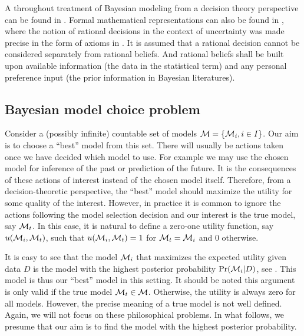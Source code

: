 \documentclass[11pt, hyper, bib, fontset=Minion]{marticle}
\begin{document}
A throughout treatment of Bayesian modeling from a decision theory perspective
can be found in \textcite{Robert:2007tc}. Formal mathematical representations
can also be found in \textcite[][sec.~5.1 and sec.~6.1]{Bernardo:1994vd},
where the notion of rational decisions in the context of uncertainty was made
precise in the form of axioms in \textcite[][chap.~2]{Bernardo:1994vd}. It is
assumed that a rational decision cannot be considered separately from rational
beliefs. And rational beliefs shall be built upon available information (the
data in the statistical term) and any personal preference input (the prior
information in Bayesian literatures).

\subsection{Bayesian model choice problem}
\label{sub:Bayesian model choice problem}

Consider a (possibly infinite) countable set of models $\mathcal{M} = \{\mathcal{M}_i,
i\in I\}$. Our aim is to choose a ``best'' model from this set. There will
usually be actions taken once we have decided which model to use. For example
we may use the chosen model for inference of the past or prediction of the
future. It is the consequences of these actions of interest instead of the
chosen model itself. Therefore, from a decision-theoretic perspective, the
``best'' model should maximize the utility for some quality of the interest.
However, in practice it is common to ignore the actions following the model
selection decision and our interest is the true model, say $\mathcal{M}_t$. In this
case, it is natural to define a zero-one utility function, say
$u(\mathcal{M}_i,\mathcal{M}_t)$, such that $u(\mathcal{M}_i,\mathcal{M}_t) = 1$ for $\mathcal{M}_t =
\mathcal{M}_i$ and $0$ otherwise.

It is easy to see that the model $\mathcal{M}_i$ that maximizes the expected utility
given data $D$ is the model with the highest posterior probability
$\Pr(\mathcal{M}_i|D)$, see \textcite[][chap.~6]{Bernardo:1994vd}. This model is
thus our ``best'' model in this setting. It should be noted this argument is
only valid if the true model $\mathcal{M}_t \in \mathcal{M}$. Otherwise, the utility is
always zero for all models. However, the precise meaning of a true model is
not well defined. Again, we will not focus on these philosophical problems. In
what follows, we presume that our aim is to find the model with the highest
posterior probability.
\end{document}
